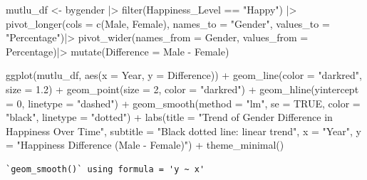 \documentclass[
  11pt,
  a4paper,
  DIV=11,
  numbers=noendperiod]{scrartcl}
\newenvironment{Shaded}{\begin{snugshade}}{\end{snugshade}}
\newcommand{\AttributeTok}[1]{\textcolor[rgb]{0.40,0.45,0.13}{#1}}
\newcommand{\ConstantTok}[1]{\textcolor[rgb]{0.56,0.35,0.01}{#1}}
\newcommand{\DecValTok}[1]{\textcolor[rgb]{0.68,0.00,0.00}{#1}}
\newcommand{\FloatTok}[1]{\textcolor[rgb]{0.68,0.00,0.00}{#1}}
\newcommand{\FunctionTok}[1]{\textcolor[rgb]{0.28,0.35,0.67}{#1}}
\newcommand{\NormalTok}[1]{\textcolor[rgb]{0.00,0.23,0.31}{#1}}
\newcommand{\OtherTok}[1]{\textcolor[rgb]{0.00,0.23,0.31}{#1}}
\newcommand{\SpecialCharTok}[1]{\textcolor[rgb]{0.37,0.37,0.37}{#1}}
\newcommand{\StringTok}[1]{\textcolor[rgb]{0.13,0.47,0.30}{#1}}
\begin{document}
\begin{Shaded}
\begin{Highlighting}[]
\NormalTok{mutlu\_df }\OtherTok{\textless{}{-}}\NormalTok{ bygender }\SpecialCharTok{|\textgreater{}} 
  \FunctionTok{filter}\NormalTok{(Happiness\_Level }\SpecialCharTok{==} \StringTok{"Happy"}\NormalTok{) }\SpecialCharTok{|\textgreater{}} 
  \FunctionTok{pivot\_longer}\NormalTok{(}\AttributeTok{cols =} \FunctionTok{c}\NormalTok{(Male, Female), }
               \AttributeTok{names\_to =} \StringTok{"Gender"}\NormalTok{, }
               \AttributeTok{values\_to =} \StringTok{"Percentage"}\NormalTok{)}\SpecialCharTok{|\textgreater{}}  
  \FunctionTok{pivot\_wider}\NormalTok{(}\AttributeTok{names\_from =}\NormalTok{ Gender, }\AttributeTok{values\_from =}\NormalTok{ Percentage)}\SpecialCharTok{|\textgreater{}}
  \FunctionTok{mutate}\NormalTok{(}\AttributeTok{Difference =}\NormalTok{ Male }\SpecialCharTok{{-}}\NormalTok{ Female)  }
  
  \FunctionTok{ggplot}\NormalTok{(mutlu\_df, }\FunctionTok{aes}\NormalTok{(}\AttributeTok{x =}\NormalTok{ Year, }\AttributeTok{y =}\NormalTok{ Difference)) }\SpecialCharTok{+}
  \FunctionTok{geom\_line}\NormalTok{(}\AttributeTok{color =} \StringTok{"darkred"}\NormalTok{, }\AttributeTok{size =} \FloatTok{1.2}\NormalTok{) }\SpecialCharTok{+}
  \FunctionTok{geom\_point}\NormalTok{(}\AttributeTok{size =} \DecValTok{2}\NormalTok{, }\AttributeTok{color =} \StringTok{"darkred"}\NormalTok{) }\SpecialCharTok{+}
  \FunctionTok{geom\_hline}\NormalTok{(}\AttributeTok{yintercept =} \DecValTok{0}\NormalTok{, }\AttributeTok{linetype =} \StringTok{"dashed"}\NormalTok{) }\SpecialCharTok{+}
  \FunctionTok{geom\_smooth}\NormalTok{(}\AttributeTok{method =} \StringTok{"lm"}\NormalTok{, }\AttributeTok{se =} \ConstantTok{TRUE}\NormalTok{, }\AttributeTok{color =} \StringTok{"black"}\NormalTok{, }\AttributeTok{linetype =} \StringTok{"dotted"}\NormalTok{) }\SpecialCharTok{+}
  \FunctionTok{labs}\NormalTok{(}\AttributeTok{title =} \StringTok{"Trend of Gender Difference in Happiness Over Time"}\NormalTok{,}
       \AttributeTok{subtitle =} \StringTok{"Black dotted line: linear trend"}\NormalTok{,}
       \AttributeTok{x =} \StringTok{"Year"}\NormalTok{, }\AttributeTok{y =} \StringTok{"Happiness Difference (Male {-} Female)"}\NormalTok{) }\SpecialCharTok{+}
  \FunctionTok{theme\_minimal}\NormalTok{()}
\end{Highlighting}
\end{Shaded}

\begin{verbatim}
`geom_smooth()` using formula = 'y ~ x'
\end{verbatim}
\end{document}
